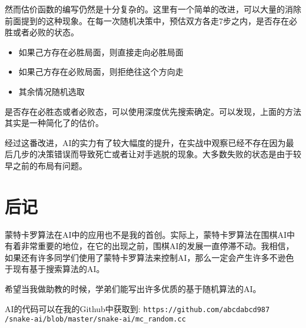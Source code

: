 \documentclass[UTF8]{ctexart}
\begin{document}
    然而估价函数的编写仍然是十分复杂的。这里有一个简单的改进，可以大量的消除前面提到的这种现象。在每一次随机决策中，预估双方各走7步之内，是否存在必胜或者必败的状态。
    \begin{itemize}
        \item 如果己方存在必胜局面，则直接走向必胜局面
        \item 如果己方存在必败局面，则拒绝往这个方向走
        \item 其余情况随机选取
    \end{itemize}
    
    是否存在必胜态或者必败态，可以使用深度优先搜索确定。可以发现，上面的方法其实是一种简化了的估价。
    
    经过这番改进，AI的实力有了较大幅度的提升，在实战中观察已经不存在因为最后几步的决策错误而导致死亡或者让对手逃脱的现象。大多数失败的状态是由于较早之前的布局有问题。

\section{后记}
    蒙特卡罗算法在AI中的应用也不是我的首创。实际上，蒙特卡罗算法在围棋AI中有着非常重要的地位，在它的出现之前，围棋AI的发展一直停滞不动。我相信，如果还有许多同学们使用了蒙特卡罗算法来控制AI，那么一定会产生许多不逊色于现有基于搜索算法的AI。
    
    希望当我做助教的时候，学弟们能写出许多优质的基于随机算法的AI。
    
    AI的代码可以在我的Github中获取到: \texttt{https://github.com/abcdabcd987\\/snake-ai/blob/master/snake-ai/mc\_random.cc}
\end{document}
